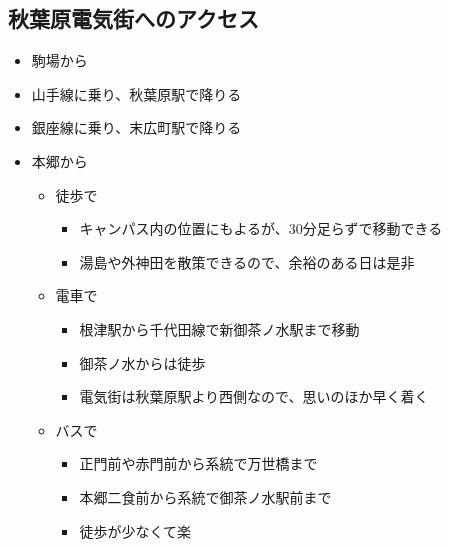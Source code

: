 \documentclass[letterpaper,10pt,dvipdfmx]{sphinxmanual}
\begin{document}
\subsection{秋葉原電気街へのアクセス}
\label{\detokenize{buy_parts:}}\label{\detokenize{buy_parts:id5}}\begin{itemize}
\item {} 
駒場から

\end{itemize}
\begin{itemize}
\item {} 
山手線に乗り、秋葉原駅で降りる

\item {} 
銀座線に乗り、末広町駅で降りる

\end{itemize}
\begin{itemize}
\item {} 
本郷から
\begin{itemize}
\item {} 
徒歩で
\begin{itemize}
\item {} 
キャンパス内の位置にもよるが、30分足らずで移動できる

\item {} 
湯島や外神田を散策できるので、余裕のある日は是非

\end{itemize}

\item {} 
電車で
\begin{itemize}
\item {} 
根津駅から千代田線で新御茶ノ水駅まで移動

\item {} 
御茶ノ水からは徒歩

\item {} 
電気街は秋葉原駅より西側なので、思いのほか早く着く

\end{itemize}

\item {} 
バスで
\begin{itemize}
\item {} 
正門前や赤門前から系統で万世橋まで

\item {} 
本郷二食前から系統で御茶ノ水駅前まで

\item {} 
徒歩が少なくて楽

\end{itemize}

\end{itemize}

\end{itemize}
\end{document}
